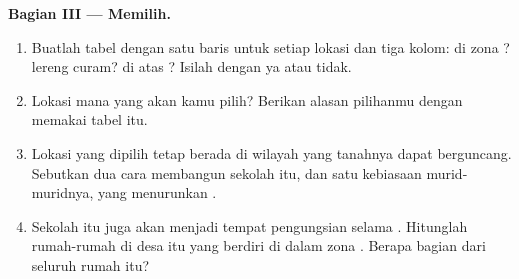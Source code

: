 \begin{problem}
\noindent\textbf{Bagian III --- Memilih.}\par\nopagebreak
\begin{enumerate}[resume, beginpenalty=10000]
  \item Buatlah tabel dengan satu baris untuk setiap lokasi dan tiga kolom:
        di zona ? lereng curam? di atas ? Isilah dengan ya atau
        tidak.
  \item Lokasi mana yang akan kamu pilih? Berikan alasan pilihanmu dengan
        memakai tabel itu.
  \item Lokasi yang dipilih tetap berada di wilayah yang tanahnya dapat
        berguncang. Sebutkan dua cara membangun sekolah itu, dan satu
        kebiasaan murid-muridnya, yang menurunkan .
  \item Sekolah itu juga akan menjadi tempat pengungsian selama .
        Hitunglah rumah-rumah di desa itu yang berdiri di dalam zona .
        Berapa bagian dari seluruh rumah itu?
\end{enumerate}
\end{problem}
